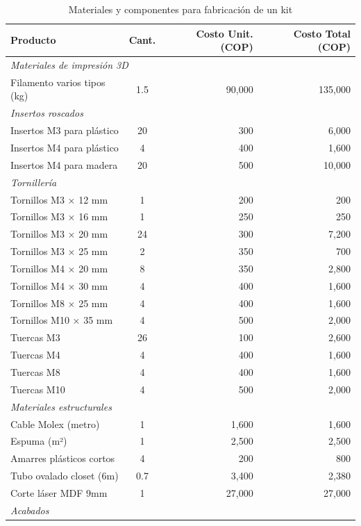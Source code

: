 \begin{table}[H]
\centering
\caption{Materiales y componentes para fabricación de un kit}
\label{tab:materiales_kit}
\footnotesize
\begin{tabular}{|l|c|r|r|}
\hline
\textbf{Producto} & \textbf{Cant.} & \textbf{Costo Unit. (COP)} & \textbf{Costo Total (COP)} \\
\hline
\multicolumn{4}{|l|}{\textit{Materiales de impresión 3D}} \\
\hline
Filamento varios tipos (kg) & 1.5 & 90,000 & 135,000 \\
\hline
\multicolumn{4}{|l|}{\textit{Insertos roscados}} \\
\hline
Insertos M3 para plástico & 20 & 300 & 6,000 \\
Insertos M4 para plástico & 4 & 400 & 1,600 \\
Insertos M4 para madera & 20 & 500 & 10,000 \\
\hline
\multicolumn{4}{|l|}{\textit{Tornillería}} \\
\hline
Tornillos M3 × 12 mm & 1 & 200 & 200 \\
Tornillos M3 × 16 mm & 1 & 250 & 250 \\
Tornillos M3 × 20 mm & 24 & 300 & 7,200 \\
Tornillos M3 × 25 mm & 2 & 350 & 700 \\
Tornillos M4 × 20 mm & 8 & 350 & 2,800 \\
Tornillos M4 × 30 mm & 4 & 400 & 1,600 \\
Tornillos M8 × 25 mm & 4 & 400 & 1,600 \\
Tornillos M10 × 35 mm & 4 & 500 & 2,000 \\
Tuercas M3 & 26 & 100 & 2,600 \\
Tuercas M4 & 4 & 400 & 1,600 \\
Tuercas M8 & 4 & 400 & 1,600 \\
Tuercas M10 & 4 & 500 & 2,000 \\
\hline
\multicolumn{4}{|l|}{\textit{Materiales estructurales}} \\
\hline
Cable Molex (metro) & 1 & 1,600 & 1,600 \\
Espuma (m²) & 1 & 2,500 & 2,500 \\
Amarres plásticos cortos & 4 & 200 & 800 \\
Tubo ovalado closet (6m) & 0.7 & 3,400 & 2,380 \\
Corte láser MDF 9mm & 1 & 27,000 & 27,000 \\
\hline
\multicolumn{4}{|l|}{\textit{Acabados}} \\

\end{tabular}
\end{table}
